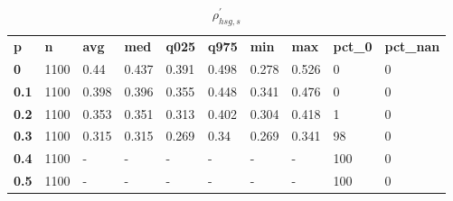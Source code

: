 \begin{table}[h]
 \centering 
\footnotesize
\caption{$\rho_{hsg,s}^\prime $}
\label{tab:alphahsgs}
\begin{tabular}[h]{| l l l l l l l l l l|
    } \hline
\textbf{ p} & \textbf{ n} & \textbf{ avg} & \textbf{ med} & \textbf{ q025} & \textbf{ q975} & \textbf{ min} & \textbf{ max} & \textbf{ pct\_0} & \textbf{ pct\_nan}
           \\
  \textbf{  0} & 1100 &  0.44 & 0.437 & 0.391 & 0.498 & 0.278 & 0.526 &   0 & 0
           \\
  \textbf{0.1} & 1100 & 0.398 & 0.396 & 0.355 & 0.448 & 0.341 & 0.476 &   0 & 0
           \\
  \textbf{0.2} & 1100 & 0.353 & 0.351 & 0.313 & 0.402 & 0.304 & 0.418 &   1 & 0
           \\
  \textbf{0.3} & 1100 & 0.315 & 0.315 & 0.269 &  0.34 & 0.269 & 0.341 &  98 & 0
           \\
  \textbf{0.4} & 1100 & - & - & - & - & - & - & 100 & 0
           \\
  \textbf{0.5} & 1100 & - & - & - & - & - & - & 100 & 0
           \\
 \hline \end{tabular}
 \end{table}
